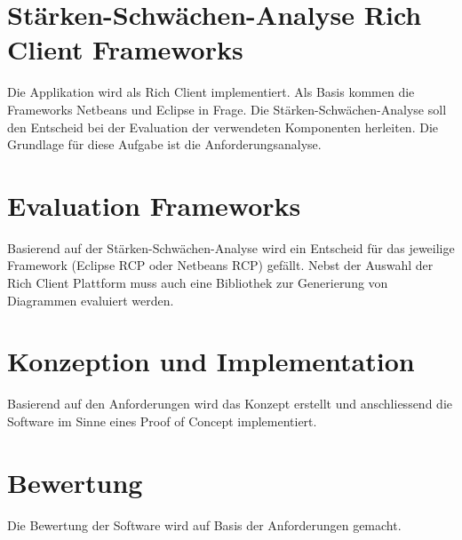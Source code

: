 \section{Stärken-Schwächen-Analyse Rich Client Frameworks}
Die Applikation wird als Rich Client implementiert. Als Basis kommen die Frameworks Netbeans und Eclipse in Frage. Die Stärken-Schwächen-Analyse soll den Entscheid bei der Evaluation der verwendeten Komponenten herleiten. Die Grundlage für diese Aufgabe ist die Anforderungsanalyse.

\section{Evaluation Frameworks}
Basierend auf der Stärken-Schwächen-Analyse wird ein Entscheid für das jeweilige Framework (Eclipse RCP oder Netbeans RCP)  gefällt. Nebst der Auswahl der Rich Client Plattform muss auch eine Bibliothek zur Generierung von Diagrammen evaluiert werden.

\section{Konzeption und Implementation}
Basierend auf den Anforderungen wird das Konzept erstellt und anschliessend die Software im Sinne eines Proof of Concept implementiert. 

\section{Bewertung}
Die Bewertung der Software wird auf Basis der Anforderungen gemacht.



